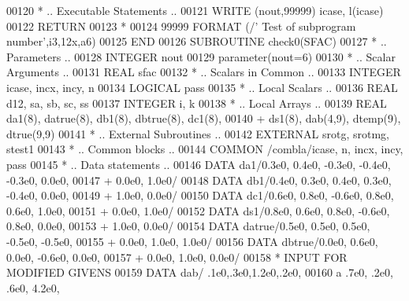 \begin{DoxyCode}
00120 \textcolor{comment}{*     .. Executable Statements ..}
00121       \textcolor{keyword}{WRITE} (nout,99999) icase, l(icase)
00122       \textcolor{keywordflow}{RETURN}
00123 \textcolor{comment}{*}
00124 99999 \textcolor{keyword}{FORMAT} (/\textcolor{stringliteral}{' Test of subprogram number'},i3,12x,a6)
00125 \textcolor{keyword}{      END}
00126 \textcolor{keyword}{      SUBROUTINE }check0(SFAC)
00127 \textcolor{comment}{*     .. Parameters ..}
00128       \textcolor{keywordtype}{INTEGER}           nout
00129       parameter(nout=6)
00130 \textcolor{comment}{*     .. Scalar Arguments ..}
00131       \textcolor{keywordtype}{REAL}              sfac
00132 \textcolor{comment}{*     .. Scalars in Common ..}
00133       \textcolor{keywordtype}{INTEGER}           icase, incx, incy, n
00134       \textcolor{keywordtype}{LOGICAL}           pass
00135 \textcolor{comment}{*     .. Local Scalars ..}
00136       \textcolor{keywordtype}{REAL}              d12, sa, sb, sc, ss
00137       \textcolor{keywordtype}{INTEGER}           i, k
00138 \textcolor{comment}{*     .. Local Arrays ..}
00139       \textcolor{keywordtype}{REAL}              da1(8), datrue(8), db1(8), dbtrue(8), dc1(8),
00140      +                  ds1(8), dab(4,9), dtemp(9), dtrue(9,9)
00141 \textcolor{comment}{*     .. External Subroutines ..}
00142       \textcolor{keywordtype}{EXTERNAL}          srotg, srotmg, stest1
00143 \textcolor{comment}{*     .. Common blocks ..}
00144       \textcolor{keyword}{COMMON}            /combla/icase, n, incx, incy, pass
00145 \textcolor{comment}{*     .. Data statements ..}
00146       \textcolor{keyword}{DATA}              da1/0.3e0, 0.4e0, -0.3e0, -0.4e0, -0.3e0, 0.0e0,
00147      +                  0.0e0, 1.0e0/
00148       \textcolor{keyword}{DATA}              db1/0.4e0, 0.3e0, 0.4e0, 0.3e0, -0.4e0, 0.0e0,
00149      +                  1.0e0, 0.0e0/
00150       \textcolor{keyword}{DATA}              dc1/0.6e0, 0.8e0, -0.6e0, 0.8e0, 0.6e0, 1.0e0,
00151      +                  0.0e0, 1.0e0/
00152       \textcolor{keyword}{DATA}              ds1/0.8e0, 0.6e0, 0.8e0, -0.6e0, 0.8e0, 0.0e0,
00153      +                  1.0e0, 0.0e0/
00154       \textcolor{keyword}{DATA}              datrue/0.5e0, 0.5e0, 0.5e0, -0.5e0, -0.5e0,
00155      +                  0.0e0, 1.0e0, 1.0e0/
00156       \textcolor{keyword}{DATA}              dbtrue/0.0e0, 0.6e0, 0.0e0, -0.6e0, 0.0e0,
00157      +                  0.0e0, 1.0e0, 0.0e0/
00158 \textcolor{comment}{*     INPUT FOR MODIFIED GIVENS}
00159       \textcolor{keyword}{DATA} dab/ .1e0,.3e0,1.2e0,.2e0,
00160      a          .7e0, .2e0, .6e0, 4.2e0,

\end{DoxyCode}
